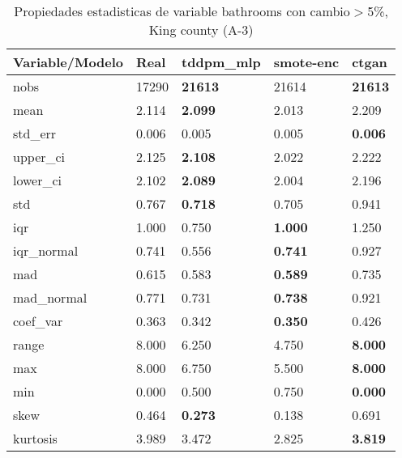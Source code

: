 \begin{table}[H]
\centering
\fontsize{8}{14}\selectfont
\caption{Propiedades estadisticas de variable bathrooms con cambio\ensuremath{>}5\%, King county (A-3)}
\label{table-stats-king county-a-3-bathrooms-short}
\begin{tabular}{|l|m{10em}|m{10em}|m{10em}|m{10em}|}
\hline
 \rowcolor[gray]{0.8}
Variable/Modelo & Real & tddpm\_mlp & smote-enc & ctgan \\
\hline nobs & 17290 & \bfseries 21613 & \cellcolor[rgb]{0.9, 0.54, 0.52} 21614 & \bfseries 21613 \\
\hline mean & 2.114 & \bfseries 2.099 & \cellcolor[rgb]{0.9, 0.54, 0.52} 2.013 & 2.209 \\
\hline std\_err & 0.006 & 0.005 & \cellcolor[rgb]{0.9, 0.54, 0.52} 0.005 & \bfseries 0.006 \\
\hline upper\_ci & 2.125 & \bfseries 2.108 & \cellcolor[rgb]{0.9, 0.54, 0.52} 2.022 & 2.222 \\
\hline lower\_ci & 2.102 & \bfseries 2.089 & \cellcolor[rgb]{0.9, 0.54, 0.52} 2.004 & 2.196 \\
\hline std & 0.767 & \bfseries 0.718 & 0.705 & \cellcolor[rgb]{0.9, 0.54, 0.52} 0.941 \\
\hline iqr & 1.000 & \cellcolor[rgb]{0.9, 0.54, 0.52} 0.750 & \bfseries 1.000 & \cellcolor[rgb]{0.9, 0.54, 0.52} 1.250 \\
\hline iqr\_normal & 0.741 & \cellcolor[rgb]{0.9, 0.54, 0.52} 0.556 & \bfseries 0.741 & \cellcolor[rgb]{0.9, 0.54, 0.52} 0.927 \\
\hline mad & 0.615 & 0.583 & \bfseries 0.589 & \cellcolor[rgb]{0.9, 0.54, 0.52} 0.735 \\
\hline mad\_normal & 0.771 & 0.731 & \bfseries 0.738 & \cellcolor[rgb]{0.9, 0.54, 0.52} 0.921 \\
\hline coef\_var & 0.363 & 0.342 & \bfseries 0.350 & \cellcolor[rgb]{0.9, 0.54, 0.52} 0.426 \\
\hline range & 8.000 & 6.250 & \cellcolor[rgb]{0.9, 0.54, 0.52} 4.750 & \bfseries 8.000 \\
\hline max & 8.000 & 6.750 & \cellcolor[rgb]{0.9, 0.54, 0.52} 5.500 & \bfseries 8.000 \\
\hline min & 0.000 & 0.500 & \cellcolor[rgb]{0.9, 0.54, 0.52} 0.750 & \bfseries 0.000 \\
\hline skew & 0.464 & \bfseries 0.273 & \cellcolor[rgb]{0.9, 0.54, 0.52} 0.138 & 0.691 \\
\hline kurtosis & 3.989 & 3.472 & \cellcolor[rgb]{0.9, 0.54, 0.52} 2.825 & \bfseries 3.819 \\

\end{tabular}
\end{table}
